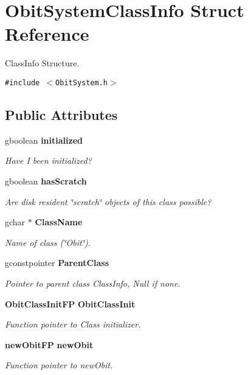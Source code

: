 \section{Obit\-System\-Class\-Info Struct Reference}
\label{structObitSystemClassInfo}
Class\-Info Structure.  


{\tt \#include $<$Obit\-System.h$>$}

\subsection*{Public Attributes}
\begin{CompactItemize}
\item 
gboolean {\bf initialized}
\begin{CompactList}\small\item\em Have I been initialized? \item\end{CompactList}\item 
gboolean {\bf has\-Scratch}
\begin{CompactList}\small\item\em Are disk resident \char`\"{}scratch\char`\"{} objects of this class possible? \item\end{CompactList}\item 
gchar $\ast$ {\bf Class\-Name}
\begin{CompactList}\small\item\em Name of class (\char`\"{}Obit\char`\"{}). \item\end{CompactList}\item 
gconstpointer {\bf Parent\-Class}
\begin{CompactList}\small\item\em Pointer to parent class Class\-Info, Null if none. \item\end{CompactList}\item 
{\bf Obit\-Class\-Init\-FP} {\bf Obit\-Class\-Init}
\begin{CompactList}\small\item\em Function pointer to Class initializer. \item\end{CompactList}\item 
{\bf new\-Obit\-FP} {\bf new\-Obit}
\begin{CompactList}\small\item\em Function pointer to new\-Obit. \item\end{CompactList}\item 

\end{CompactItemize}
